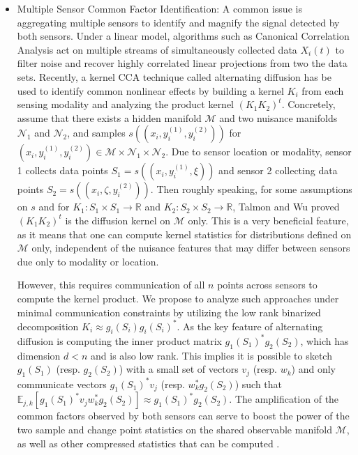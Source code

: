 \documentclass{article}
\newcommand{\comment}[3]{{\color{#1} {\bf #2 :} #3}}
\newcommand{\yoav}[1]{\comment{magenta}{Yoav}{#1}}
\begin{document}
\begin{itemize}
\item Multiple Sensor Common Factor Identification: A common issue is aggregating multiple sensors to identify and magnify the signal detected by both sensors.  Under a linear model, algorithms such as Canonical Correlation Analysis \cite{} act on multiple streams of simultaneously collected data $X_i(t)$ to filter noise and recover highly correlated linear projections from two the data sets.
Recently, a kernel CCA technique called alternating diffusion \cite{Talmon Lederman} has be used to identify common nonlinear effects by building a kernel $K_i$ from each sensing modality and analyzing the product kernel $(K_1 K_2)^t$.   Concretely, assume that there exists a hidden manifold $\mathcal{M}$ and two nuisance manifolds $\mathcal{N}_1$ and $\mathcal{N}_2$, and samples $s((x_i,y_i^{(1)}, y_i^{(2)}))$ for $(x_i,y_i^{(1)}, y_i^{(2)})\in \mathcal{M}\times \mathcal{N}_1\times \mathcal{N}_2$.  Due to sensor location or modality, sensor 1 collects data points $S_1 = s((x_i,y_i^{(1)}, \xi))$ and sensor 2 collecting data points $S_2 = s((x_i,\zeta,y_i^{(2)}))$.  Then roughly speaking, for some assumptions on $s$ and for $K_1: S_1\times S_1 \rightarrow \mathbb{R}$ and $K_2:S_2\times S_2 \rightarrow \mathbb{R}$, Talmon and Wu \cite{Talmon Wu} proved $(K_1 K_2)^t$ is the diffusion kernel on $\mathcal{M}$ only.   This is a very beneficial feature, as it means that one can compute kernel statistics for distributions defined on $\mathcal{M}$ only, independent of the nuisance features that may differ between sensors due only to modality or location.


However, this requires communication of all $n$ points across sensors to compute the kernel product.  We propose to analyze such approaches under minimal communication constraints by utilizing the low rank binarized decomposition $K_i \approx g_i(S_i) g_i(S_i)^*$.  As the key feature of alternating diffusion is computing the inner product matrix $g_1(S_1)^* g_2(S_2)$, which has dimension $d<n$ and is also low rank.  This implies it is possible to sketch $g_1(S_1)$ (resp. $g_2(S_2)$) with a small set of vectors $v_j$ (resp. $w_k$) and only communicate vectors $g_1(S_1)^* v_j$ (resp. $w_k^* g_2(S_2)$) such that $\mathbb{E}_{j,k}[g_1(S_1)^* v_j w_k^* g_2(S_2)] \approx g_1(S_1)^* g_2(S_2)$.  The amplification of the common factors observed by both sensors can serve to boost the power of the two sample and change point statistics on the shared observable manifold $\mathcal{M}$, as well as other compressed statistics that can be computed \cite{Griboval}.
\end{itemize}
\end{document}

